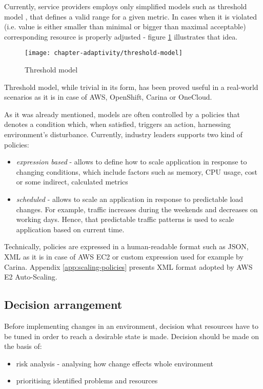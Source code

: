 Currently, service providers employs only simplified models such as threshold model \cite{LiWoZh05}, that defines a valid range for a given metric. In cases when it is violated (i.e. value is either smaller than minimal or bigger than maximal acceptable) corresponding resource is properly adjusted - figure \ref{fig:threshold-model} illustrates that idea.

\begin{figure}[!ht]
  \begin{center}
    \texttt{[image: chapter-adaptivity/threshold-model]}
  \end{center}
  \caption{Threshold model}
  \label{fig:threshold-model}
\end{figure}

Threshold model, while trivial in its form, has been proved useful in a real-world scenarios as it is in case of AWS, OpenShift, Carina or OneCloud.

As it was already mentioned, models are often controlled by a policies that denotes a condition which, when satisfied, triggers an action, harnessing environment's disturbance. Currently, industry leaders supports \cite{AmazonAutoScaling} two kind of policies:
\begin{itemize}
 \item \textit{expression based} - allows to define how to scale application in response to changing conditions, which include factors such as memory, CPU usage, cost or some indirect, calculated metrics
 \item \textit{scheduled} - allows to scale an application in response to predictable load changes. For example, traffic increases during the weekends and decreases on working days. Hence, that predictable traffic patterns is used to scale application based on current time.
\end{itemize}

Technically, policies are expressed in a human-readable format such as JSON, XML as it is in case of AWS EC2 or custom expression used for example by Carina. Appendix \ref{app:scaling-policies} presents XML format adopted by AWS E2 Auto-Scaling.

\subsection{Decision arrangement}
Before implementing changes in an environment, decision what resources have to be tuned in order to reach a desirable state is made. Decision should be made on the basis of:
\begin{itemize}
 \item risk analysis - analysing how change effects whole environment
 \item prioritising identified problems and resources
\end{itemize}

